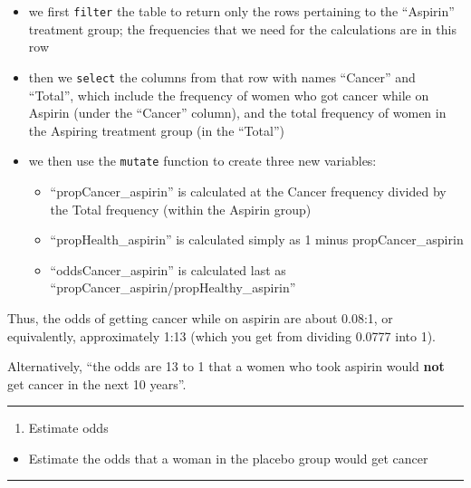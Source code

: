 \documentclass[
]{book}
\providecommand{\tightlist}{%
  \setlength{\itemsep}{0pt}\setlength{\parskip}{0pt}}
\begin{document}
\begin{itemize}
\tightlist
\item
  we first \texttt{filter} the table to return only the rows pertaining to the ``Aspirin'' treatment group; the frequencies that we need for the calculations are in this row
\item
  then we \texttt{select} the columns from that row with names ``Cancer'' and ``Total'', which include the frequency of women who got cancer while on Aspirin (under the ``Cancer'' column), and the total frequency of women in the Aspiring treatment group (in the ``Total'')
\item
  we then use the \texttt{mutate} function to create three new variables:

  \begin{itemize}
  \tightlist
  \item
    ``propCancer\_aspirin'' is calculated at the Cancer frequency divided by the Total frequency (within the Aspirin group)
  \item
    ``propHealth\_aspirin'' is calculated simply as 1 minus propCancer\_aspirin
  \item
    ``oddsCancer\_aspirin'' is calculated last as ``propCancer\_aspirin/propHealthy\_aspirin''
  \end{itemize}
\end{itemize}

Thus, the odds of getting cancer while on aspirin are about 0.08:1, or equivalently, approximately 1:13 (which you get from dividing 0.0777 into 1).

Alternatively, ``the odds are 13 to 1 that a women who took aspirin would \textbf{not} get cancer in the next 10 years''.

\begin{center}\rule{0.5\linewidth}{0.5pt}\end{center}

\begin{enumerate}
\def\labelenumi{\arabic{enumi}.}
\tightlist
\item
  Estimate odds
\end{enumerate}

\begin{itemize}
\tightlist
\item
  Estimate the odds that a woman in the placebo group would get cancer
\end{itemize}

\begin{center}\rule{0.5\linewidth}{0.5pt}\end{center}
\end{document}
